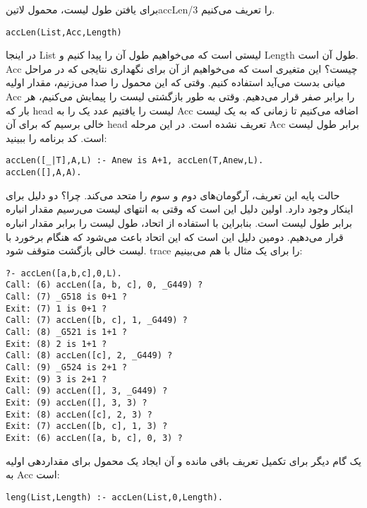 برای یافتن طول لیست، محمول ‌لاتین{accLen/3} را تعریف می‌کنیم.

\begin{latin}
\begin{lstlisting}
accLen(List,Acc,Length)
\end{lstlisting}
\end{latin}

در اینجا List لیستی است که می‌خواهیم طول آن را پیدا کنیم و Length طول آن است. Acc چیست؟ این متغیری است که می‌خواهیم از آن برای نگهداری نتایجی که در مراحل میانی بدست می‌آید استفاده کنیم. وقتی که این محمول را صدا می‌زنیم، مقدار اولیه Acc را برابر صفر قرار می‌دهیم. وقتی به طور بازگشتی لیست را پیمایش می‌کنیم، هر بار که head لیست را یافتیم عدد یک را به Acc اضافه می‌کنیم تا زمانی که به یک لیست خالی برسیم که برای آن head تعریف نشده است. در این مرحله Acc برابر طول لیست است. کد برنامه را ببینید:

\begin{latin}
\begin{lstlisting}
accLen([_|T],A,L) :- Anew is A+1, accLen(T,Anew,L).
accLen([],A,A).
\end{lstlisting}
\end{latin}

حالت پایه این تعریف، آرگومان‌های دوم و سوم را متحد می‌کند. چرا؟ دو دلیل برای اینکار وجود دارد. اولین دلیل این است که وقتی به انتهای لیست می‌رسیم مقدار انباره برابر طول لیست است. بنابراین با استفاده از اتحاد، طول لیست را برابر مقدار انباره قرار می‌دهیم. دومین دلیل این است که این اتحاد باعث می‌شود که هنگام برخورد با لیست خالی بازگشت متوقف شود. trace را برای یک مثال با هم می‌بینیم:

\begin{latin}
\begin{lstlisting}
?- accLen([a,b,c],0,L).
Call: (6) accLen([a, b, c], 0, _G449) ?
Call: (7) _G518 is 0+1 ?
Exit: (7) 1 is 0+1 ?
Call: (7) accLen([b, c], 1, _G449) ?
Call: (8) _G521 is 1+1 ?
Exit: (8) 2 is 1+1 ?
Call: (8) accLen([c], 2, _G449) ?
Call: (9) _G524 is 2+1 ?
Exit: (9) 3 is 2+1 ?
Call: (9) accLen([], 3, _G449) ?
Exit: (9) accLen([], 3, 3) ?
Exit: (8) accLen([c], 2, 3) ?
Exit: (7) accLen([b, c], 1, 3) ?
Exit: (6) accLen([a, b, c], 0, 3) ?
\end{lstlisting}
\end{latin}

یک گام دیگر برای تکمیل تعریف باقی مانده و آن ایجاد یک محمول برای مقداردهی اولیه به Acc است:

\begin{latin}
\begin{lstlisting}
leng(List,Length) :- accLen(List,0,Length).
\end{lstlisting}
\end{latin}

